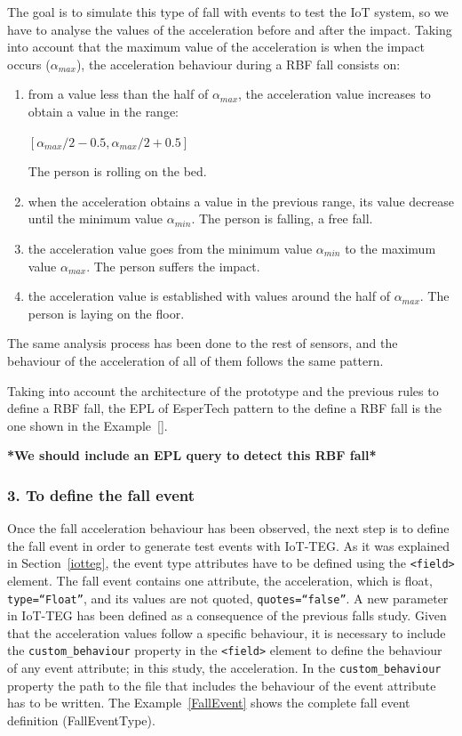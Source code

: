 \documentclass[conference]{IEEEtran}
\theoremstyle{definition}
\begin{document}
The goal is to simulate this type of fall with events to test the IoT system, so we have to analyse the values of 
the acceleration before and after the impact. Taking into account that the maximum value of the acceleration is 
when the impact occurs ($\alpha_{max}$), the acceleration behaviour during a RBF fall consists on:
\begin{enumerate}
 \item from a value less than the half of $\alpha_{max}$, the acceleration value increases to obtain a value in the range:
  \begin{center}
  $[\alpha_{max}/2 - 0.5, \alpha_{max}/2 + 0.5]$
  \end{center}
 The person is rolling on the bed.
 \item when the acceleration obtains a value in the previous range, its value decrease until the minimum value $\alpha_{min}$.
 The person is falling, a free fall.
 \item the acceleration value goes from the minimum value $\alpha_{min}$ to the maximum value $\alpha_{max}$. The person
 suffers the impact.
 \item the acceleration value is established with values around the half of $\alpha_{max}$. The person is laying on the floor. 
\end{enumerate}

The same analysis process has been done to the rest of sensors, and the behaviour of the acceleration of all of them 
follows the same pattern.

Taking into account the architecture of the prototype and the previous rules to define a RBF fall, the EPL of EsperTech
pattern to the define a RBF fall is the one shown in the Example~\ref{}.

\textbf{*We should include an EPL query to detect this RBF fall*}

\subsubsection*{3. To define the fall event} Once the fall acceleration behaviour has been observed, the next step is to define the 
fall event in order to generate test events with IoT-TEG. As it was explained in Section~\ref{iotteg}, the event type attributes have
to be defined using the \texttt{<field>} element. The fall event contains one attribute, the acceleration, which is float, 
\texttt{type=``Float''}, and its values are not quoted, \texttt{quotes=``false''}. A new parameter in IoT-TEG has been defined as a 
consequence of the previous falls study. Given that the acceleration values follow a specific behaviour, it is necessary to include 
the \texttt{custom\_behaviour} property in the \texttt{<field>} element to define the behaviour of any event attribute; 
in this study, the acceleration. In the \texttt{custom\_behaviour} property the path to the file that includes the behaviour of the 
event attribute has to be written. The Example~\ref{FallEvent} shows the complete fall event definition (FallEventType).
\end{document}
